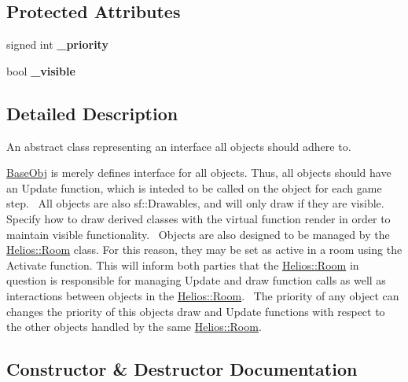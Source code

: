 \subsection*{Protected Attributes}
\begin{DoxyCompactItemize}
\item 
\hypertarget{class_helios_1_1_base_obj_aad807d0a4296ffdfddf2e653b428481a}{}signed int {\bfseries \+\_\+priority}\label{class_helios_1_1_base_obj_aad807d0a4296ffdfddf2e653b428481a}

\item 
\hypertarget{class_helios_1_1_base_obj_aed78a9a68c038e6d82e07711f9065e33}{}bool {\bfseries \+\_\+visible}\label{class_helios_1_1_base_obj_aed78a9a68c038e6d82e07711f9065e33}

\end{DoxyCompactItemize}


\subsection{Detailed Description}
An abstract class representing an interface all objects should adhere to. 

\hyperlink{class_helios_1_1_base_obj}{Base\+Obj} is merely defines interface for all objects. Thus, all objects should have an Update function, which is inteded to be called on the object for each game step.~\newline
 All objects are also sf\+::\+Drawables, and will only draw if they are visible. Specify how to draw derived classes with the virtual function render in order to maintain visible functionality.~\newline
 Objects are also designed to be managed by the \hyperlink{class_helios_1_1_room}{Helios\+::\+Room} class. For this reason, they may be set as active in a room using the Activate function. This will inform both parties that the \hyperlink{class_helios_1_1_room}{Helios\+::\+Room} in question is responsible for managing Update and draw function calls as well as interactions between objects in the \hyperlink{class_helios_1_1_room}{Helios\+::\+Room}.~\newline
 The priority of any object can changes the priority of this object\textquotesingle{}s draw and Update functions with respect to the other objects handled by the same \hyperlink{class_helios_1_1_room}{Helios\+::\+Room}.~\newline


\subsection{Constructor \& Destructor Documentation}
\hypertarget{class_helios_1_1_base_obj_ad77bdec51d537c1bfc9661b728980498}{}
